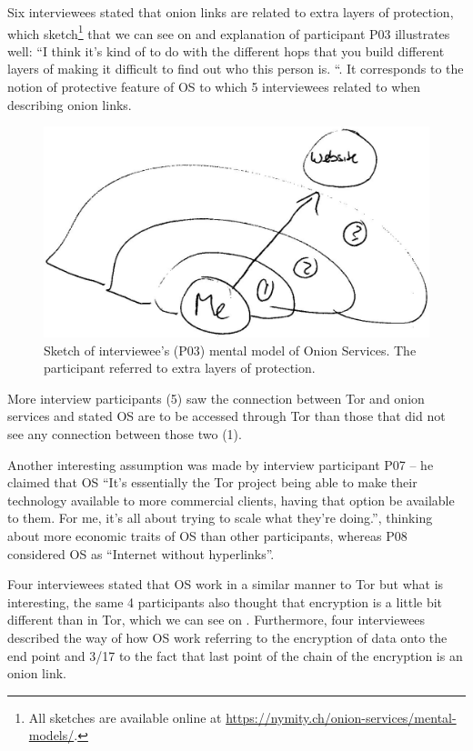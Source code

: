 Six interviewees stated that onion links are related to extra layers of protection, which sketch\footnote{All sketches are available online at
\url{https://nymity.ch/onion-services/mental-models/}.} that we can see on  and explanation of participant P03 illustrates well:   “I think it's kind of to do with the different hops that you build different layers of making it difficult to find out who this person is. “. It corresponds to the notion of protective feature of OS to which 5 interviewees related to when describing onion links.

\begin{figure}[!ht]
    \centering
        \centering
        \includegraphics[width=0.8\linewidth]{figures/p03-os-sketch-kopia2.jpg}
        \caption{Sketch of interviewee's (P03) mental model of Onion Services. The participant referred to extra layers of protection.}
        \label{fig:os-sketch}
\end{figure}

More interview participants (5) saw the connection between Tor and onion services and stated OS are to be accessed through Tor than those that did not see any connection between those two (1).

Another interesting assumption was made by interview participant P07 – he claimed that OS 
“It's essentially the Tor project being able to make their technology available to more commercial clients, having that option be available to them. For me, it's all about trying to scale what they're doing.”, thinking about more economic traits of OS than other participants, whereas P08 considered OS as “Internet without hyperlinks”.

Four interviewees stated that OS work in a similar manner to Tor but what is interesting, the same 4 participants also thought that encryption is a little bit different than in Tor, which we can see on . Furthermore, four interviewees described the way of how OS work referring to the encryption of data onto the end point and 3/17 to the fact that last point of the chain of the encryption is an onion link. 


